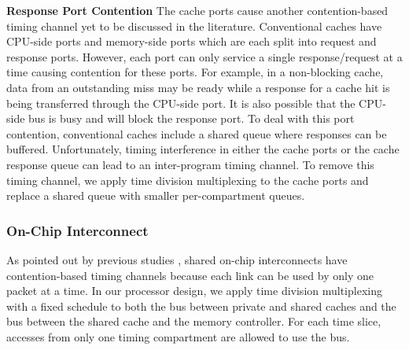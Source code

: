 \textbf{Response Port Contention}
The cache ports cause another contention-based timing channel yet to be 
discussed in the literature. Conventional caches have CPU-side ports and 
memory-side ports which are each split into request and response ports. 
However, each port can only service a single response/request at a time
causing contention for these ports. For example, in a non-blocking cache,
data from an outstanding miss may be ready while a response for a cache hit
is being transferred through the CPU-side port.
It is also possible that the CPU-side bus is busy and will block the response
port. 
To deal with this port contention, conventional caches include a shared queue
where responses can be buffered. Unfortunately, timing interference in either 
the cache ports or the cache response queue can
lead to an inter-program timing channel. To remove this timing channel, we apply
time division multiplexing to the cache ports and replace a shared queue with
smaller per-compartment queues.

\subsubsection{On-Chip Interconnect}

As pointed out by previous studies \cite{yaonocs, surfnoc}, shared on-chip 
interconnects have contention-based timing channels because each link can
be used by only one packet at a time. In our processor design, we apply time
division multiplexing with a fixed schedule to both the bus between private
and shared caches and the bus between the shared cache and the memory 
controller.
For each time slice, accesses from only one timing compartment are allowed to
use the bus.

